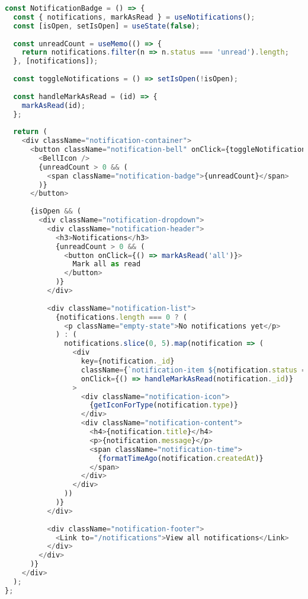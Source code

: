 \documentclass[12pt,a4paper]{report}
\begin{document}
\begin{lstlisting}[language=JavaScript, caption=Notification Badge Component]
const NotificationBadge = () => {
  const { notifications, markAsRead } = useNotifications();
  const [isOpen, setIsOpen] = useState(false);
  
  const unreadCount = useMemo(() => {
    return notifications.filter(n => n.status === 'unread').length;
  }, [notifications]);
  
  const toggleNotifications = () => setIsOpen(!isOpen);
  
  const handleMarkAsRead = (id) => {
    markAsRead(id);
  };
  
  return (
    <div className="notification-container">
      <button className="notification-bell" onClick={toggleNotifications}>
        <BellIcon />
        {unreadCount > 0 && (
          <span className="notification-badge">{unreadCount}</span>
        )}
      </button>
      
      {isOpen && (
        <div className="notification-dropdown">
          <div className="notification-header">
            <h3>Notifications</h3>
            {unreadCount > 0 && (
              <button onClick={() => markAsRead('all')}>
                Mark all as read
              </button>
            )}
          </div>
          
          <div className="notification-list">
            {notifications.length === 0 ? (
              <p className="empty-state">No notifications yet</p>
            ) : (
              notifications.slice(0, 5).map(notification => (
                <div 
                  key={notification._id}
                  className={`notification-item ${notification.status === 'unread' ? 'unread' : ''}`}
                  onClick={() => handleMarkAsRead(notification._id)}
                >
                  <div className="notification-icon">
                    {getIconForType(notification.type)}
                  </div>
                  <div className="notification-content">
                    <h4>{notification.title}</h4>
                    <p>{notification.message}</p>
                    <span className="notification-time">
                      {formatTimeAgo(notification.createdAt)}
                    </span>
                  </div>
                </div>
              ))
            )}
          </div>
          
          <div className="notification-footer">
            <Link to="/notifications">View all notifications</Link>
          </div>
        </div>
      )}
    </div>
  );
};
\end{lstlisting}
\end{document}
